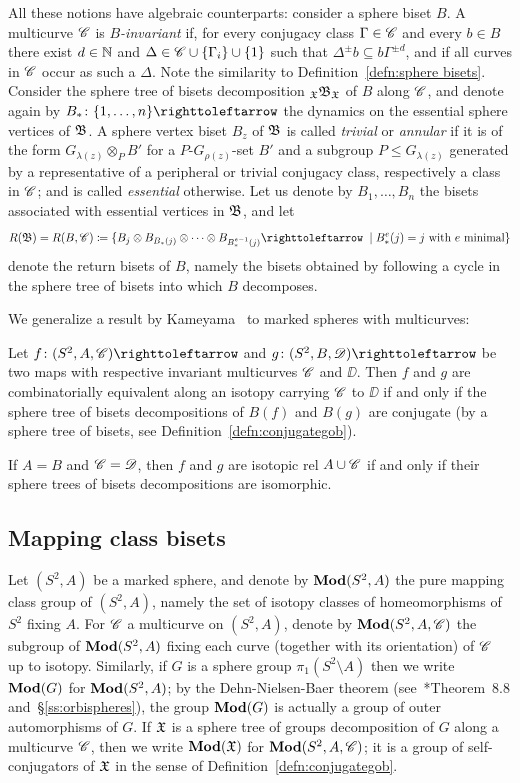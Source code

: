 \documentclass{amsart}
\begin{document}
All these notions have algebraic counterparts: consider a sphere biset
$B$. A multicurve ${\mathscr C}$ is \emph{$B$-invariant} if, for every
conjugacy class $\Gamma\in{\mathscr C}$ and every $b\in B$ there exist $d\in{\mathbb N}$
and $\Delta\in{\mathscr C}\cup\{\Gamma_i\}\cup\{1\}$ such that
$\Delta^{\pm} b\subseteq b\Gamma^{\pm d}$, and if all curves in ${\mathscr C}$
occur as such a $\Delta$. Note the similarity to
Definition~\ref{defn:sphere bisets}.  Consider the sphere tree of
bisets decomposition $\subscript {\gf}\gfB_\gf$ of $B$ along ${\mathscr C}$,
and denote again by $B_*\colon\{1,\dots,n\}\selfmap$ the dynamics on
the essential sphere vertices of ${\mathfrak B}$. A sphere vertex biset $B_z$
of ${\mathfrak B}$ is called \emph{trivial} or \emph{annular} if it is of the
form $G_{\lambda(z)}\otimes_P B'$ for a $P$-$G_{\rho(z)}$-set $B'$ and
a subgroup $P\le G_{\lambda(z)}$ generated by a representative of a
peripheral or trivial conjugacy class, respectively a class in ${\mathscr C}$;
and is called \emph{essential} otherwise. Let us denote by
$B_1,\dots,B_n$ the bisets associated with essential vertices in
${\mathfrak B}$, and let
\[R(\gfB)=R(B,\CC)\coloneqq\{B_j\otimes B_{B_*(j)}\otimes\cdots\otimes
B_{B_*^{e-1}(j)}\selfmap\;\mid B_*^e(j)=j\text{ with $e$ minimal}\}
\]
denote the return bisets of $B$, namely the bisets obtained by
following a cycle in the sphere tree of bisets into which $B$
decomposes.

\noindent We generalize a result by Kameyama~\cite{kameyama:thurston}
to marked spheres with multicurves:
\begin{thm}\label{thm:kameyama}
  Let $f\colon(S^2,A,\CC)\selfmap$ and $g\colon(S^2,B,\DD)\selfmap$ be
  two maps with respective invariant multicurves ${\mathscr C}$ and $\DD$. Then
  $f$ and $g$ are combinatorially equivalent along an isotopy carrying
  ${\mathscr C}$ to $\DD$ if and only if the sphere tree of bisets
  decompositions of $B(f)$ and $B(g)$ are conjugate (by a sphere tree
  of bisets, see Definition~\ref{defn:conjugategob}).

  If $A=B$ and ${\mathscr C}={\mathscr D}$, then $f$ and $g$ are isotopic rel $A\cup{\mathscr C}$
  if and only if their sphere trees of bisets decompositions are isomorphic.
\end{thm}

\subsection{Mapping class bisets}\label{ss:mcb}
Let $(S^2,A)$ be a marked sphere, and denote by $\mathbf{\relax Mod}(S^2,A)$ the pure
mapping class group of $(S^2,A)$, namely the set of isotopy classes of
homeomorphisms of $S^2$ fixing $A$. For ${\mathscr C}$ a multicurve on
$(S^2,A)$, denote by $\mathbf{\relax Mod}(S^2,A,{\mathscr C})$ the subgroup of $\mathbf{\relax Mod}(S^2,A)$
fixing each curve (together with its orientation) of ${\mathscr C}$ up to
isotopy. Similarly, if $G$ is a sphere group $\pi_1(S^2\setminus A)$
then we write $\mathbf{\relax Mod}(G)$ for $\mathbf{\relax Mod}(S^2,A)$; by the Dehn-Nielsen-Baer
theorem (see~\cite{farb-margalit:mcg}*{Theorem~8.8}
and~\S\ref{ss:orbispheres}), the group $\mathbf{\relax Mod}(G)$ is actually a group
of outer automorphisms of $G$. If ${\mathfrak X}$ is a sphere tree of groups
decomposition of $G$ along a multicurve ${\mathscr C}$, then we write
$\mathbf{\relax Mod}({\mathfrak X})$ for $\mathbf{\relax Mod}(S^2,A,{\mathscr C})$; it is a group of self-conjugators
of ${\mathfrak X}$ in the sense of Definition~\ref{defn:conjugategob}.
\end{document}

